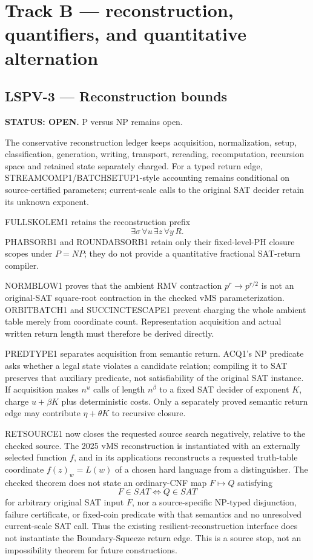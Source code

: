 \documentclass[11pt]{article}
\begin{document}
\section{Track B --- reconstruction, quantifiers, and quantitative alternation}

\subsection{LSPV-3 --- Reconstruction bounds}
\textbf{STATUS: OPEN.} P versus NP remains open.

The conservative reconstruction ledger keeps acquisition, normalization, setup, classification, generation, writing, transport, rereading, recomputation, recursion space and retained state separately charged. For a typed return edge, STREAMCOMP1/BATCHSETUP1-style accounting remains conditional on source-certified parameters; current-scale calls to the original SAT decider retain its unknown exponent.

FULLSKOLEM1 retains the reconstruction prefix
\[
\exists\sigma\,\forall u\,\exists z\,\forall y\,R.
\]
PHABSORB1 and ROUNDABSORB1 retain only their fixed-level-PH closure scopes under \(P=NP\); they do not provide a quantitative fractional SAT-return compiler.

NORMBLOW1 proves that the ambient RMV contraction \(p^r\to p^{r/2}\) is not an original-SAT square-root contraction in the checked vMS parameterization. ORBITBATCH1 and SUCCINCTESCAPE1 prevent charging the whole ambient table merely from coordinate count. Representation acquisition and actual written return length must therefore be derived directly.

PREDTYPE1 separates acquisition from semantic return. ACQ1's NP predicate asks whether a legal state violates a candidate relation; compiling it to SAT preserves that auxiliary predicate, not satisfiability of the original SAT instance. If acquisition makes \(n^u\) calls of length \(n^\beta\) to a fixed SAT decider of exponent \(K\), charge \(u+\beta K\) plus deterministic costs. Only a separately proved semantic return edge may contribute \(\eta+\theta K\) to recursive closure.

RETSOURCE1 now closes the requested source search negatively, relative to the checked source. The 2025 vMS reconstruction is instantiated with an externally selected function \(f\), and in its applications reconstructs a requested truth-table coordinate \(f(z)_w=L(w)\) of a chosen hard language from a distinguisher. The checked theorem does not state an ordinary-CNF map \(F\mapsto Q\) satisfying
\[
F\in SAT\iff Q\in SAT
\]
for arbitrary original SAT input \(F\), nor a source-specific NP-typed disjunction, failure certificate, or fixed-coin predicate with that semantics and no unresolved current-scale SAT call. Thus the existing resilient-reconstruction interface does not instantiate the Boundary-Squeeze return edge. This is a source stop, not an impossibility theorem for future constructions.
\end{document}
